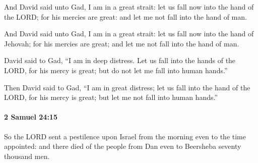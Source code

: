 			And David said unto Gad, I am in a great strait: let us fall now into the hand of the LORD; for his mercies are great: and let me not fall into the hand of man.

			\begin{versebox}
					\item[BHS] 
					\item[ASV] And David said unto Gad, I am in a great strait: let us fall now into the hand of Jehovah; for his mercies are great; and let me not fall into the hand of man.
					\item[NIV] David said to Gad, “I am in deep distress. Let us fall into the hands of the LORD, for his mercy is great; but do not let me fall into human hands.”
					\item[NRSV] Then David said to Gad, “I am in great distress; let us fall into the hand of the LORD, for his mercy is great; but let me not fall into human hands.”
			\end{versebox}

		\paragraph{2 Samuel 24:15} %
			\label{2SAMUEL-24-15}

			So the LORD sent a pestilence upon Israel from the morning even to the time appointed: and there died of the people from Dan even to Beersheba seventy thousand men.

